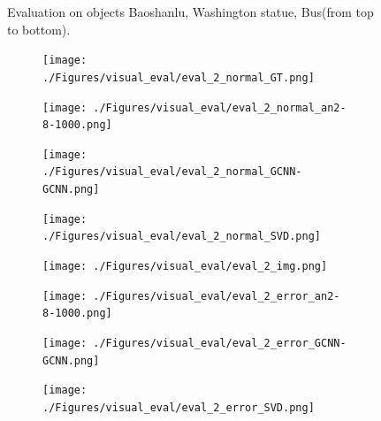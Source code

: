 \documentclass[border=15pt, multi, tikz]{article}
\begin{document}
\begin{figure}[H]
	
	
	\caption{Evaluation on objects Baoshanlu, Washington statue, Bus(from top to bottom).}
	\label{fig:final-eval}
\end{figure}


\begin{figure}[H]
	\centering
	\begin{subfigure}[b]{0.24\linewidth}
		\texttt{[image: ./Figures/visual\_eval/eval\_2\_normal\_GT.png]}
	\end{subfigure}
	\begin{subfigure}[b]{0.24\linewidth}
		\texttt{[image: ./Figures/visual\_eval/eval\_2\_normal\_an2-8-1000.png]}
	\end{subfigure}
	\begin{subfigure}[b]{0.24\linewidth}
		\texttt{[image: ./Figures/visual\_eval/eval\_2\_normal\_GCNN-GCNN.png]}
	\end{subfigure}
	\begin{subfigure}[b]{0.24\linewidth}
	\texttt{[image: ./Figures/visual\_eval/eval\_2\_normal\_SVD.png]}
	\end{subfigure}

	\begin{subfigure}[b]{0.24\linewidth}
	\texttt{[image: ./Figures/visual\_eval/eval\_2\_img.png]}
\end{subfigure}
\begin{subfigure}[b]{0.24\linewidth}
	\texttt{[image: ./Figures/visual\_eval/eval\_2\_error\_an2-8-1000.png]}
\end{subfigure}
\begin{subfigure}[b]{0.24\linewidth}
	\texttt{[image: ./Figures/visual\_eval/eval\_2\_error\_GCNN-GCNN.png]}
\end{subfigure}
\begin{subfigure}[b]{0.24\linewidth}
	\texttt{[image: ./Figures/visual\_eval/eval\_2\_error\_SVD.png]}
\end{subfigure}





\end{figure}
\end{document}
